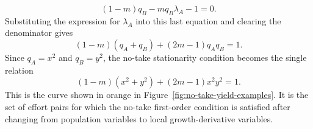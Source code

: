 \documentclass{article}
\numberwithin{equation}{section}
\begin{document}
\begin{equation*}
    (1-m)q_B-mq_B\lambda_A-1=0.
\end{equation*}
Substituting the expression for $\lambda_A$ into this last equation and
clearing the denominator gives
\begin{equation*}
    (1-m)(q_A+q_B)+(2m-1)q_Aq_B=1.
\end{equation*}
Since $q_A=x^2$ and $q_B=y^2$, the no-take stationarity condition becomes
the single relation
\begin{equation}
    \label{eq:no-take-stationarity-curve}
    (1-m)(x^2+y^2)+(2m-1)x^2y^2=1.
\end{equation}
This is the curve shown in orange in Figure~\ref{fig:no-take-yield-examples}. It is the set of effort pairs for
which the no-take first-order condition is satisfied after changing from
population variables to local growth-derivative variables.
\end{document}
